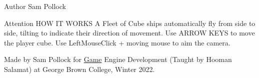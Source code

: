 \begin{DoxyAuthor}{Author}
Sam Pollock
\end{DoxyAuthor}
\begin{DoxyAttention}{Attention}
HOW IT WORKS A Fleet of Cube ships automatically fly from side to side, tilting to indicate their direction of movement. Use ARROW KEYS to move the player cube. Use Left\+Mouse\+Click + moving mouse to aim the camera.
\end{DoxyAttention}
Made by Sam Pollock for \mbox{\hyperlink{class_game}{Game}} Engine Development (Taught by Hooman Salamat) at George Brown College, Winter 2022. 